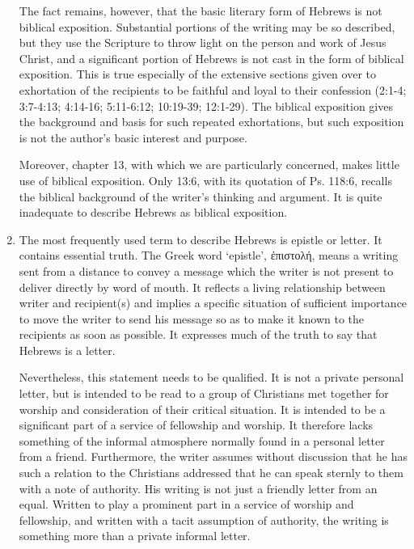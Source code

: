 \begin{enumerate}
The fact remains, however, that the basic literary form of Hebrews is not
biblical exposition.
Substantial portions of the writing may be so described, but they use the
Scripture to throw light on the person and work of Jesus Christ, and a
significant portion of Hebrews is not cast in the form of biblical exposition.
This is true especially of the extensive sections given over to exhortation of
the recipients to be faithful and loyal to their confession (2:1-4; 3:7-4:13;
4:14-16; 5:11-6:12; 10:19-39; 12:1-29).
The biblical exposition gives the background and basis for such repeated
exhortations, but such exposition is not the author's basic interest and
purpose.
\newline

Moreover, chapter 13, with which we are particularly concerned, makes little use
of biblical exposition.
Only 13:6, with its quotation of Ps. 118:6, recalls the biblical background of
the writer's thinking and argument.
It is quite inadequate to describe Hebrews as biblical exposition.

\item The most frequently used term to describe Hebrews is epistle or letter.
It contains essential truth.
The Greek word `epistle', ἐπιστολή, means a writing sent from a distance to
convey a message which the writer is not present to deliver directly by word of
mouth.
It reflects a living relationship between writer and recipient(s) and implies a
specific situation of sufficient importance to move the writer to send his
message so as to make it known to the recipients as soon as possible.
It expresses much of the truth to say that Hebrews is a letter.
\newline

Nevertheless, this statement needs to be qualified.
It is not a private personal letter, but is intended to be read to a group of
Christians met together for worship and consideration of their critical
situation.
It is intended to be a significant part of a service of fellowship and worship.
It therefore lacks something of the informal atmosphere normally found in a
personal letter from a friend.
Furthermore, the writer assumes without discussion that he has such a relation
to the Christians addressed that he can speak sternly to them with a note of
authority.
His writing is not just a friendly letter from an equal.
Written to play a prominent part in a service of worship and fellowship, and
written with a tacit assumption of authority, the writing is something more than
a private informal letter.
\newline


\end{enumerate}
